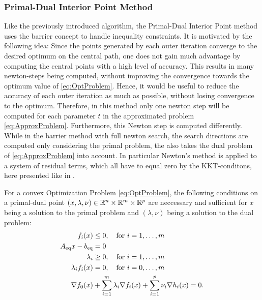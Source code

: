 \subsubsection{Primal-Dual Interior Point Method}
Like the previously introduced algorithm, the Primal-Dual Interior Point method uses the barrier concept to handle inequality constraints. It is motivated by the following idea: Since the points generated by each outer iteration converge to the desired optimum on the central path, one does not gain much advantage by computing the central points with a high level of accuracy. This results in many newton-steps being computed, without improving the convergence towards the optimum value of \eqref{eq:OptProblem}. Hence, it would be useful to reduce the accuracy of each outer iteration as much as possible, without losing convergence to the optimum. Therefore, in this method only one newton step will be computed for each parameter $ t $ in the approximated problem  \eqref{eq:ApproxProblem}. Furthermore, this Newton step is computed differently. While in the barrier method with full newton search,  the search directions are computed only considering the primal problem, the \pdm also takes the dual problem of \eqref{eq:ApproxProblem} into account. In particular Newton's method is applied to a system of residual terms, which all have to equal zero by the KKT-conditons, here presented like in \cite{BV}.\\
\begin{theorem}
	For a convex Optimization Problem \eqref{eq:OptProblem}, the following conditions on a primal-dual point $ (x,\lambda,\nu) \in \mathbb{R}^n \times \mathbb{R}^m \times \mathbb{R}^p$ are neccessary and sufficient for $ x $ being a solution to the primal problem and $ (\lambda, \nu) $ being a solution to the dual problem:
	\begin{subequations}
			\begin{align}
		f_i(x) &\leq 0, \quad \text{for } i = 1,\dots,m\\
		{A}_{\mathrm{eq}} x - {b}_{\mathrm{eq}} &= 0\\
		\lambda_i &\geq 0,  \quad \text{for } i = 1,\dots,m\\
		\lambda_i f_i(x) & = 0, \quad \text{for } i = 0, \dots,m\\
		\nabla f_0(x) &+ \sum_{i=1}^{m} \lambda_i \nabla f_i(x) + \sum_{i=1}^{p} \nu_i \nabla h_i (x) = 0.
		\end{align}
	\end{subequations}
\end{theorem}

